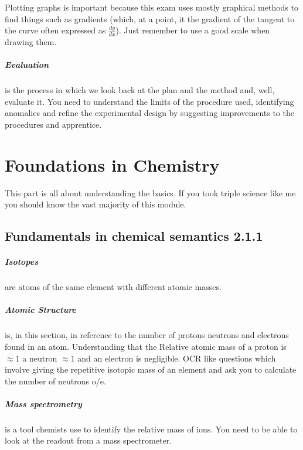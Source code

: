 \documentclass[11pt,a4paper]{memoir}
\begin{document}
	Plotting graphs is important because this exam uses mostly graphical methods to find things such as gradients (which, at a point, it the gradient of the tangent to the curve often expressed as $\frac{dy}{dx}$). Just remember to use a good scale when drawing them.
	
	\paragraph{Evaluation} is the process in which we look back at the plan and the method and, well, evaluate it. You need to understand the limits of the procedure used, identifying anomalies and refine the experimental design by suggesting improvements to the procedures and apprentice.
	
\chapter{Foundations in Chemistry}
	This part is all about understanding the basics. If you took triple science like me you should know the vast majority of this module.
	
\section{Fundamentals in chemical semantics 2.1.1}
	
	\paragraph{Isotopes} are atoms of the same element with different atomic masses.
	
	\paragraph{Atomic Structure} is, in this section, in reference to the number of protons neutrons and electrons found in an atom. Understanding that the Relative atomic mass of a proton is $\approx 1$ a neutron $\approx 1$ and an electron is negligible. OCR like questions which involve giving the repetitive isotopic mass of an element and ask you to calculate the number of neutrons o/e.
	
	\paragraph{Mass spectrometry} is a tool chemists use to identify the relative mass of ions. You need to be able to look at the readout from a mass spectrometer.
	
\end{document}
